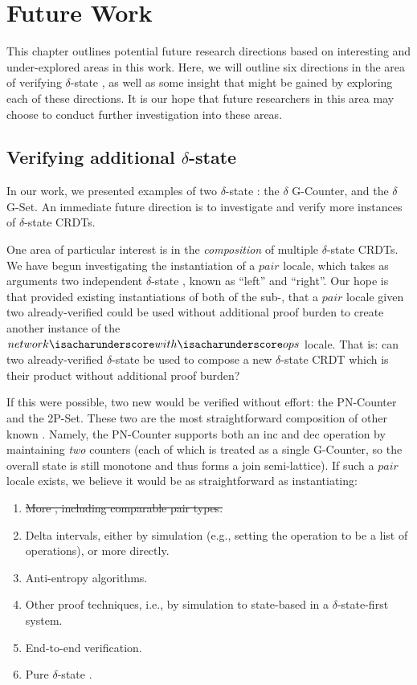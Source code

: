 \chapter{Future Work}
\label{chap:future-work}

This chapter outlines potential future research directions based on interesting
and under-explored areas in this work. Here, we will outline six directions in
the area of verifying $\delta$-state \CRDTs, as well as some insight that might
be gained by exploring each of these directions. It is our hope that future
researchers in this area may choose to conduct further investigation into these
areas.

\section{Verifying additional $\delta$-state \CRDTs}
In our work, we presented examples of two $\delta$-state \CRDTs: the $\delta$
G-Counter, and the $\delta$ G-Set. An immediate future direction is to
investigate and verify more instances of $\delta$-state CRDTs.

One area of particular interest is in the \emph{composition} of multiple
$\delta$-state CRDTs. We have begun investigating the instantiation of a $pair$
locale, which takes as arguments two independent $\delta$-state \CRDTs, known as
``left'' and ``right''. Our hope is that provided existing instantiations of
both of the sub-\CRDTs, that a $pair$ locale given two already-verified \CRDTs
could be used without additional proof burden to create another instance of the
$network{\isacharunderscore}with{\isacharunderscore}ops$ locale. That is: can
two already-verified $\delta$-state \CRDTs be used to compose a new
$\delta$-state CRDT which is their product without additional proof burden?

If this were possible, two new \CRDTs would be verified without effort: the
PN-Counter and the 2P-Set. These two \CRDTs are the most straightforward
composition of other known \CRDTs. Namely, the PN-Counter supports both an
\textsf{inc} and \textsf{dec} operation by maintaining \emph{two} counters (each
of which is treated as a single G-Counter, so the overall state is still
monotone and thus forms a join semi-lattice). If such a $pair$ locale exists, we
believe it would be as straightforward as instantiating: \TODO


\begin{enumerate}
  \item \sout{More \CRDTs, including comparable pair types.}
  \item Delta intervals, either by simulation (e.g., setting the operation to be
    a list of operations), or more directly.
  \item Anti-entropy algorithms.
  \item Other proof techniques, i.e., by simulation to state-based \CRDTs in a
    $\delta$-state-first system.
  \item End-to-end verification.
  \item Pure $\delta$-state \CRDTs.
\end{enumerate}
